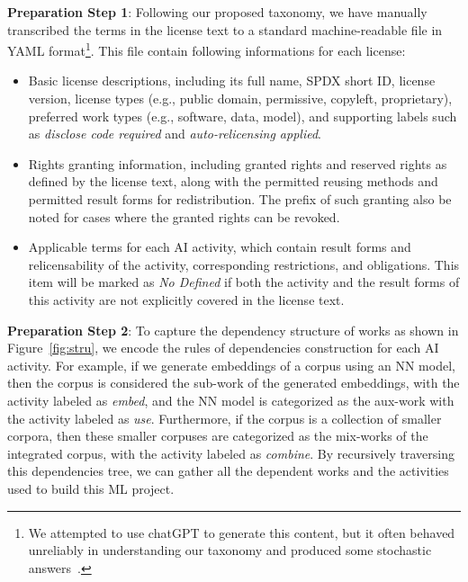 \textbf{Preparation Step 1}: Following our proposed taxonomy, we have manually transcribed the terms in the license text to a standard machine-readable file in YAML format\footnote{We attempted to use chatGPT to generate this content, but it often behaved unreliably in understanding our taxonomy and produced some stochastic answers~\cite{bender2021dangers}.}.
This file contain following informations for each license:
\begin{itemize}[leftmargin=*]
    \item Basic license descriptions, including its full name, SPDX short ID, license version, license types (e.g., public domain, permissive, copyleft, proprietary), preferred work types (e.g., software, data, model), and supporting labels such as \textit{disclose code required} and \textit{auto-relicensing applied}.
    
    \item Rights granting information, including granted rights and reserved rights as defined by the license text, along with the permitted reusing methods and permitted result forms for redistribution.
    The prefix of such granting also be noted for cases where the granted rights can be revoked.

    \item Applicable terms for each AI activity, which contain result forms and relicensability of the activity, corresponding restrictions, and obligations. 
    This item will be marked as \textit{No Defined} if both the activity and the result forms of this activity are not explicitly covered in the license text.
\end{itemize}

\textbf{Preparation Step 2}:
To capture the dependency structure of works as shown in Figure~\ref{fig:stru}, we encode the rules of dependencies construction for each AI activity.
For example, if we generate embeddings of a corpus using an NN model, then the corpus is considered the sub-work of the generated embeddings, with the activity labeled as \textit{embed}, and the NN model is categorized as the aux-work with the activity labeled as \textit{use}.
Furthermore, if the corpus is a collection of smaller corpora, then these smaller corpuses are categorized as the mix-works of the integrated corpus, with the activity labeled as \textit{combine}.
By recursively traversing this dependencies tree, we can gather all the dependent works and the activities used to build this ML project.

